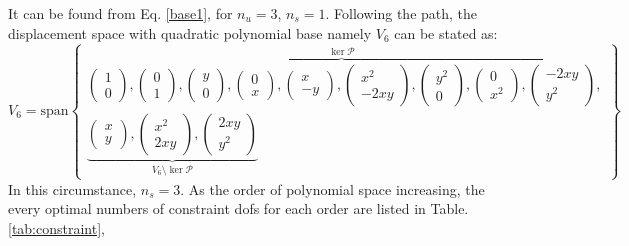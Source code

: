 It can be found from Eq. \eqref{base1}, for $n_u = 3$, $n_s = 1$. Following the path, the displacement space with quadratic polynomial base namely $V_6$ can be stated as:
\begin{equation}\label{base2}
V_6 = \mathrm{span}
\begin{Bmatrix}
\overbrace{
\begin{pmatrix} 1 \\ 0 \end{pmatrix},
\begin{pmatrix} 0 \\ 1 \end{pmatrix},
\begin{pmatrix} y \\ 0 \end{pmatrix},
\begin{pmatrix} 0 \\ x \end{pmatrix},
\begin{pmatrix} x \\ -y \end{pmatrix},
\begin{pmatrix} x^2 \\ -2xy \end{pmatrix},
\begin{pmatrix} y^2 \\ 0 \end{pmatrix},
\begin{pmatrix} 0 \\ x^2 \end{pmatrix},
\begin{pmatrix} -2xy \\ y^2 \end{pmatrix}
}^{\ker \mathcal P}, \\
\underbrace{
\begin{pmatrix} x \\ y \end{pmatrix},
\begin{pmatrix} x^2 \\ 2xy \end{pmatrix},
\begin{pmatrix} 2xy \\ y^2 \end{pmatrix}
}_{V_6\setminus \ker \mathcal P}
\end{Bmatrix}
\end{equation}
In this circumstance, $n_s = 3$. As the order of polynomial space increasing, the every optimal numbers of constraint dofs for each order are listed in Table. \ref{tab:constraint}, 
